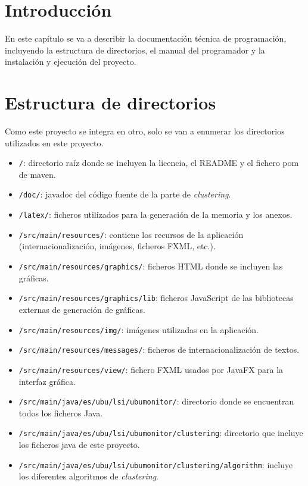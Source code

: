 
\section{Introducción}
En este capítulo se va a describir la documentación técnica de programación, incluyendo la estructura de directorios, el manual del programador y la instalación y ejecución del proyecto.

\section{Estructura de directorios}
Como este proyecto se integra en otro, solo se van a enumerar los directorios utilizados en este proyecto.

\begin{itemize}
	\item \texttt{/}: directorio raíz donde se incluyen la licencia, el README y el fichero pom de maven.
	\item \texttt{/doc/}: javadoc del código fuente de la parte de \emph{clustering}.
	\item \texttt{/latex/}: ficheros utilizados para la generación de la memoria y los anexos.
	\item \texttt{/src/main/resources/}: contiene los recursos de la aplicación (internacionalización, imágenes, ficheros FXML, etc.).
	\item \texttt{/src/main/resources/graphics/}: ficheros HTML donde se incluyen las gráficas.
	\item \texttt{/src/main/resources/graphics/lib}: ficheros JavaScript de las bibliotecas externas de generación de gráficas.
	\item \texttt{/src/main/resources/img/}: imágenes utilizadas en la aplicación.
	\item \texttt{/src/main/resources/messages/}: ficheros de internacionalización de textos.
	\item \texttt{/src/main/resources/view/}: fichero FXML usados por JavaFX para la interfaz gráfica.
	\item \texttt{/src/main/java/es/ubu/lsi/ubumonitor/}: directorio donde se encuentran todos los ficheros Java.
	\item \texttt{/src/main/java/es/ubu/lsi/ubumonitor/clustering}: directorio que incluye los ficheros java de este proyecto.
	\item \texttt{/src/main/java/es/ubu/lsi/ubumonitor/clustering/algorithm}: incluye los diferentes algoritmos de \emph{clustering}.

\end{itemize}
